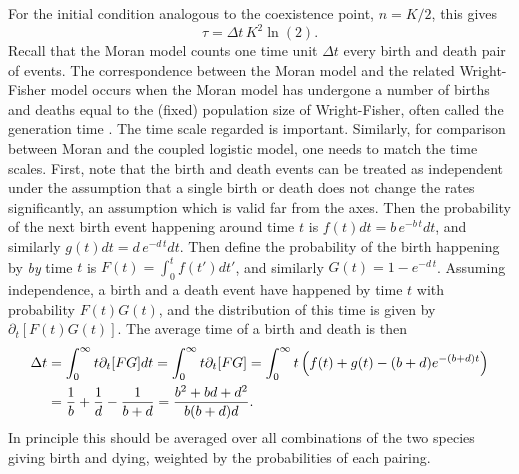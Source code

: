 For the initial condition analogous to the coexistence point, $n = K/2$, this gives
\begin{equation*}
\tau = \Delta t\,K^2\ln\left(2\right).
\end{equation*}
Recall that the Moran model counts one time unit $\Delta t$ every birth and death pair of events. 
The correspondence between the Moran model and the related Wright-Fisher model occurs when the Moran model has undergone a number of births and deaths equal to the (fixed) population size of Wright-Fisher, often called the generation time \cite{Blythe2007}. 
The time scale regarded is important. 
Similarly, for comparison between Moran and the coupled logistic model, one needs to match the time scales. 
First, note that the birth and death events can be treated as independent under the assumption that a single birth or death does not change the rates significantly, an assumption which is valid far from the axes. 
Then the probability of the next birth event happening around time $t$ is $f(t)dt = b\,e^{-b\,t}dt$, and similarly $g(t)dt = d\,e^{-d\,t}dt$. 
Then define the probability of the birth happening by \emph{by} time $t$ is $F(t) = \int_0^t f(t') dt'$, and similarly $G(t) = 1-e^{-d\,t}$. 
Assuming independence, a birth and a death event have happened by time $t$ with probability $F(t)G(t)$, and the distribution of this time is given by $\partial_t[F(t)G(t)]$. 
The average time of a birth and death is then
\begin{align*}
 \Delta t &= \int_{0}^{\infty} t \partial_t[FG] dt = \int_{0}^{\infty} t \partial_t[FG] = \int_{0}^{\infty} t \left(f(t) + g(t) - (b+d)e^{-(b+d)t}\right) \notag \\
          &= \frac{1}{b} + \frac{1}{d} - \frac{1}{b+d} = \frac{b^2 + b d + d^2}{b (b+d) d}.
\end{align*}
In principle this should be averaged over all combinations of the two species giving birth and dying, weighted by the probabilities of each pairing. 
